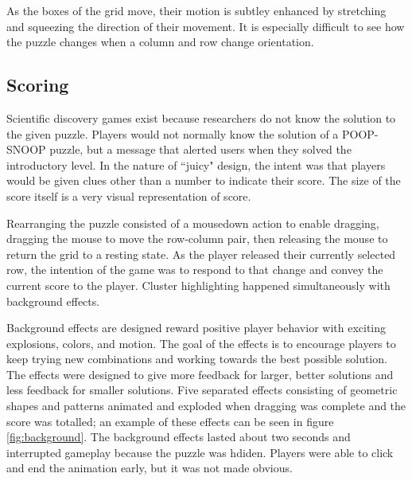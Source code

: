 As the boxes of the grid move, their motion is subtley enhanced by stretching and squeezing the direction of their movement. It is especially difficult to see how the puzzle changes when a column and row change orientation.

\subsection{Scoring}

Scientific discovery games exist because researchers do not know the solution to the given puzzle. Players would not normally know the solution of a POOP-SNOOP puzzle, but a message that alerted users when they solved the introductory level. In the nature of ``juicy" design, the intent was that players would be given clues other than a number to indicate their score. The size of the score itself is a very visual representation of score.

Rearranging the puzzle consisted of a mousedown action to enable dragging, dragging the mouse to move the row-column pair, then releasing the mouse to return the grid to a resting state. As the player released their currently selected row, the intention of the game was to respond to that change and convey the current score to the player. Cluster highlighting happened simultaneously with background effects.

Background effects are designed reward positive player behavior with exciting explosions, colors, and motion. The goal of the effects is to encourage players to keep trying new combinations and working towards the best possible solution. The effects were designed to give more feedback for larger, better solutions and less feedback for smaller solutions. Five separated effects consisting of geometric shapes and patterns animated and exploded when dragging was complete and the score was totalled; an example of these effects can be seen in figure \ref{fig:background}. The background effects lasted about two seconds and interrupted gameplay because the puzzle was hdiden. Players were able to click and end the animation early, but it was not made obvious.

